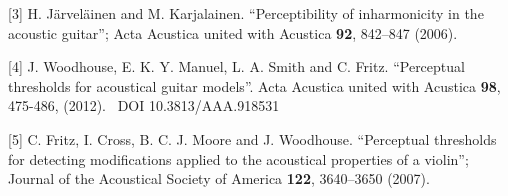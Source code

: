   [3] H. Järveläinen and M. Karjalainen. ``Perceptibility of inharmonicity in 
  the acoustic guitar''; Acta Acustica united with Acustica \textbf{92}, 
  842–847 (2006). 

  [4] J. Woodhouse, E. K. Y. Manuel, L. A. Smith and C. Fritz. ``Perceptual 
  thresholds for acoustical guitar models''. Acta Acustica united with Acustica 
  \textbf{98}, 475-486, (2012).~ DOI 10.3813/AAA.918531 

  [5] C. Fritz, I. Cross, B. C. J. Moore and J. Woodhouse. ``Perceptual 
  thresholds for detecting modifications applied to the acoustical properties 
  of a violin''; Journal of the Acoustical Society of America \textbf{122}, 
  3640–3650 (2007). 